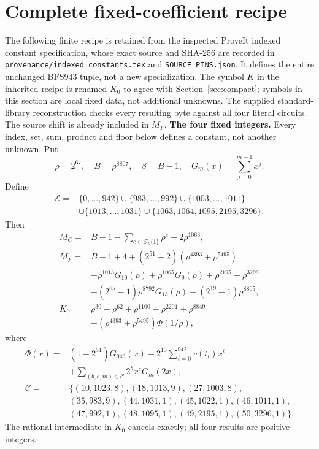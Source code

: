 \section{Complete fixed-coefficient recipe}\label{sec:compact-constants}
The following finite recipe is retained from the inspected ProveIt indexed
constant specification, whose exact source and SHA-256 are recorded in
\texttt{provenance/indexed\_constants.tex} and
\texttt{SOURCE\_PINS.json}. It defines the entire unchanged
BFS943 tuple, not a new specialization. The symbol $K$ in the inherited
recipe is renamed $K_0$ to agree with Section~\ref{sec:compact}; symbols
in this section are local fixed data, not additional unknowns. The supplied
standard-library reconstruction checks every resulting byte against all
four literal circuits. The source shift is already included in $M_F$.
\begingroup
\providecommand{\fl}[1]{\left\lfloor#1\right\rfloor}
\providecommand{\rg}[2]{\{#1,\ldots,#2\}}
\textbf{The four fixed integers.}
Every index, set, sum, product and floor below defines a constant, not
another unknown. Put
\[
\rho=2^{67},\quad B=\rho^{8807},\quad\beta=B-1,\quad
G_m(x)=\sum_{j=0}^{m-1}x^j.
\]
Define
\[
\begin{split}
\mathcal E={}&\rg0{942}\cup\rg{983}{992}\cup\rg{1003}{1011}\\
&\cup\rg{1013}{1031}\cup\{1063,1064,1095,2195,3296\}.
\end{split}
\]
Then
\begin{align*}
M_C={}&B-1-\sum_{e\in\mathcal E\setminus\{1\}}\rho^e-2\rho^{1063},\\
M_F={}&B-1+4+(2^{51}-2)(\rho^{4393}+\rho^{5495})\\
&+\rho^{1013}G_{10}(\rho)+\rho^{1065}G_9(\rho)
  +\rho^{2195}+\rho^{3296}\\
&+(2^{65}-1)\rho^{8792}G_{13}(\rho)+(2^{19}-1)\rho^{8805},\\
K_0={}&\rho^{30}+\rho^{62}+\rho^{1100}+\rho^{2201}+\rho^{8849}\\
&+(\rho^{4393}+\rho^{5495})\Phi(1/\rho),
\end{align*}
where
\[
\begin{split}
\Phi(x)={}&(1+2^{51})G_{943}(x)
 -2^{10}\sum_{i=0}^{942}v(t_i)x^i\\
&+\sum_{(b,e,m)\in\mathcal C}2^b x^e G_m(2x),\\
\mathcal C={}&\{(10,1023,8),(18,1013,9),(27,1003,8),\\
&(35,983,9),(44,1031,1),(45,1022,1),(46,1011,1),\\
&(47,992,1),(48,1095,1),(49,2195,1),(50,3296,1)\}.
\end{split}
\]
The rational intermediate in $K_0$ cancels exactly; all four results are positive integers.

